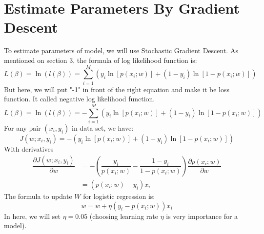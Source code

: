 \documentclass{article}
\begin{document}
\section {Estimate Parameters By Gradient Descent}
    To estimate parameters of model, we will use Stochastic Gradient Descent. As mentioned on section 3, the formula of log likelihood function is: 
    \begin{equation} 
         L(\beta) = \ln(l(\beta)) = \sum_{i=1}^{M} \left(y_{i}\ln[p(x_{i}; w)] + (1 - y_{i})\ln[1 -  p(x_{i}; w)]\right)
    \end{equation} 
    But here, we will put "-1" in front of the right equation and make it be loss function. It called negative log likelihood function.
    \begin{equation} 
        L(\beta) = \ln(l(\beta)) = - \sum_{i=1}^{M} \left(y_{i}\ln[p(x_{i}; w)] + (1 - y_{i})\ln[1 -  p(x_{i}; w)]\right)
    \end{equation} 
    For any pair $(x_{i}, y_{i})$ in data set, we have: 
    \begin{equation} 
            J(w; x_{i}, y_{i}) = -\left(y_{i}\ln \left[p(x_{i}; w)\right] + (1 - y_{i})\ln \left[1 -  p(x_{i}; w)\right]\right)
    \end{equation}
    With derivatives
    \begin{align} 
        \dfrac{\partial J(w; x_{i}, y_{i})}{\partial w} &= - \left(
        \dfrac{y_{i}}{p(x_{i}; w)} - \dfrac{1 - y_{i}}{1 - p(x_{i}; w)} \right) \dfrac{\partial p(x_{i}; w)}{\partial w}
        \nonumber
        \\
        &= \left(p(x_{i}; w) - y_{i}\right)x_{i}
    \end{align} 
    The formula to update $W$ for logistic regression is: 
    \begin{equation}
        w = w + \eta(y_{i} - p(x_{i}; w))x_{i}
    \end{equation}
    In here, we will set $\eta = 0.05$ (choosing learning rate $\eta$ is very importance for a model).
    \newpage 
    
\end{document}
